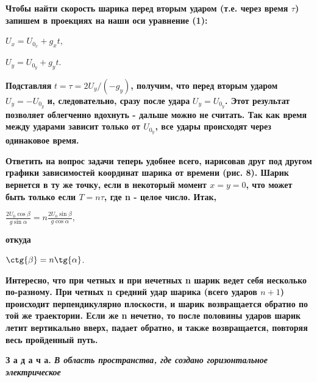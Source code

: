 \documentclass[a4paper,14pt]{article}
\begin{document}
    \begin{multicols}{2}
        
        \noindent\textbf{Чтобы найти скорость шарика перед вторым ударом (т.е. через время $\tau$) запишем в проекциях на наши оси уравнение (1):}
        
        \begin{center}
            \noindent $U_x = U_{0_x} + g_xt$,
        
            \noindent $U_y = U_{0_y} + g_yt$.
        \end{center}
        
        \noindent\textbf{Подставляя} $t=\tau=2U_y/(-g_y)$\textbf{, получим, что перед вторым ударом} $U_y=-U_{0_y}$ \textbf{и, следовательно, сразу после удара} $U_y=U_{0_y}$\textbf{. Этот результат позволяет облегченно вдохнуть - дальше можно не считать. Так как время между ударами зависит только от $U_{0_y}$, все удары происходят через одинаковое время.}
        
        \textbf{Ответить на вопрос задачи теперь удобнее всего, нарисовав друг под другом графики зависимостей координат шарика от времени (рис. 8). Шарик вернется в ту же точку, если в некоторый момент $x=y=0$, что  может быть только если $T=n\tau$, где n - целое число. Итак,}
        
        \begin{center}
            $\frac{2U_0\cos\beta}{g\sin{\alpha}} = n\frac{2U_0\sin\beta}{g\cos{\alpha}}$,     
        \end{center}
        
        \noindent\textbf{откуда}
        
        \begin{center}
            $\ctg{\beta} = n \tg{\alpha}$.
        \end{center}
        
        \textbf{Интересно, что при четных и при нечетных n шарик ведет себя несколько по-разному. При четных n средний удар шарика (всего ударов $n + 1$) происходит перпендикулярно плоскости, и шарик возвращается обратно по той же траектории. Если же n нечетно, то после половины ударов шарик летит вертикально вверх, падает обратно, и также возвращается, повторяя весь пройденный путь.}
        
        \textbf{З а д а ч а. \textit{В область пространства, где создано горизонтальное электрическое}}
        
        \columnbreak
        

\end{multicols}
\end{document}
